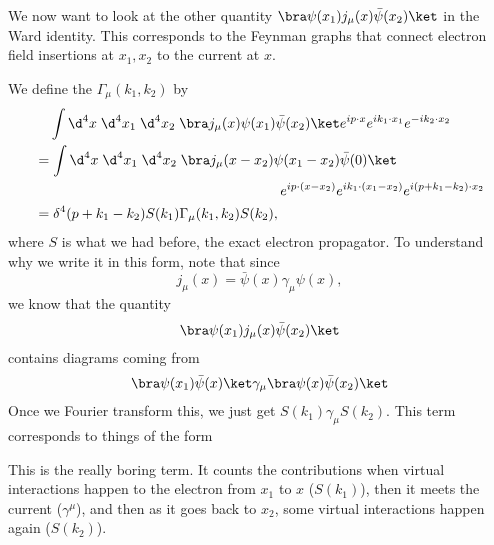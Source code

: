 \documentclass[a4paper]{article}
\begin{document}
We now want to look at the other quantity $\bra \psi(x_1) j_\mu(x) \bar\psi(x_2)\ket$ in the Ward identity. This corresponds to the Feynman graphs that connect electron field insertions at $x_1, x_2$ to the current at $x$.

We define the  $\Gamma_\mu(k_1, k_2)$ by
\begin{align*}
  &\hphantom{={}}\int \d^4 x\; \d^4 x_1\; \d^4 x_2\; \bra j_\mu(x) \psi(x_1) \bar\psi(x_2)\ket e^{ip\cdot x} e^{ik_1 \cdot x_1} e^{-ik_2 \cdot x_2}\\
  &= \int \d^4 x\; \d^4 x_1\; \d^4 x_2\; \bra j_\mu (x - x_2) \psi(x_1 - x_2) \bar\psi(0) \ket\\
  &\hphantom{\int \d^4 x\; \d^4 x_1\; \d^4 x_2\; hereissomespacefi} e^{ip\cdot (x - x_2)} e^{ik_1 \cdot (x_1 - x_2)} e^{i(p + k_1 - k_2)\cdot x_2}\\
  &= \delta^4(p + k_1 - k_2) S(k_1) \Gamma_\mu(k_1, k_2) S(k_2),
\end{align*}
where $S$ is what we had before, the exact electron propagator. To understand why we write it in this form, note that since
\[
  j_\mu(x) = \bar\psi(x) \gamma_\mu \psi(x),
\]
we know that the quantity
\[
  \bra \psi(x_1) j_\mu(x) \bar\psi(x_2)\ket
\]
contains diagrams coming from
\[
  \bra \psi(x_1) \bar\psi(x)\ket \gamma_\mu \bra \psi(x) \bar\psi(x_2)\ket
\]
Once we Fourier transform this, we just get $S(k_1) \gamma_\mu S(k_2)$. This term corresponds to things of the form
\begin{center}
\end{center}
This is the really boring term. It counts the contributions when virtual interactions happen to the electron from $x_1$ to $x$ ($S(k_1)$), then it meets the current ($\gamma^\mu$), and then as it goes back to $x_2$, some virtual interactions happen again ($S(k_2)$).
\end{document}
